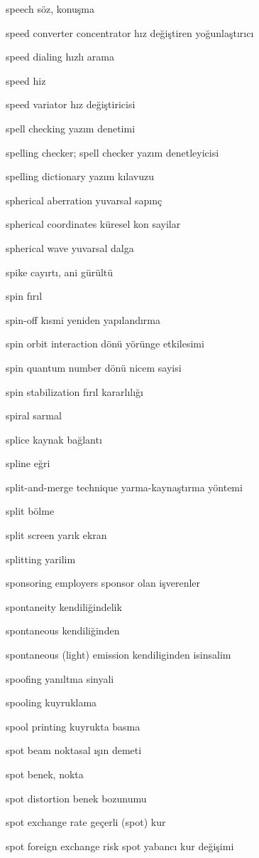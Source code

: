 \documentclass[12pt,fleqn]{article}\usepackage{../../common}
\begin{document}
speech söz, konuşma

speed converter concentrator hız değiştiren yoğunlaştırıcı

speed dialing hızlı arama

speed hiz

speed variator hız değiştiricisi

spell checking yazım denetimi

spelling checker; spell checker yazım denetleyicisi

spelling dictionary yazım kılavuzu

spherical aberration yuvarsal sapınç

spherical coordinates küresel kon sayilar

spherical wave yuvarsal dalga

spike cayırtı, ani gürültü

spin fırıl

spin-off kısmi yeniden yapılandırma

spin orbit interaction dönü yörünge etkilesimi

spin quantum number dönü nicem sayisi

spin stabilization fırıl kararlılığı

spiral sarmal

splice kaynak bağlantı

spline eğri

split-and-merge technique yarma-kaynaştırma yöntemi

split bölme

split screen yarık ekran

splitting yarilim

sponsoring employers sponsor olan işverenler

spontaneity kendiliğindelik

spontaneous kendiliğinden

spontaneous (light) emission kendiliginden isinsalim

spoofing yanıltma sinyali

spooling kuyruklama

spool printing kuyrukta basma

spot beam noktasal ışın demeti

spot benek, nokta

spot distortion benek bozunumu

spot exchange rate geçerli (spot) kur

spot foreign exchange risk spot yabancı kur değişimi
\end{document}
